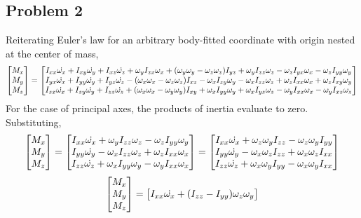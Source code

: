 \documentclass[class=report, 12pt, crop=false]{standalone}
\begin{document}
\begin{center}
\section{Problem 2}
\begin{comment}
\end{comment}
Reiterating Euler's law for an arbitrary body-fitted coordinate with origin nested at the center of mass,
$$\begin{bmatrix}M_x \\ M_y \\ M_z\end{bmatrix} = 
\begin{bmatrix} 
I_{xx}\dot{\w_x} + I_{xy}\dot{\w_y} + I_{xz}\dot{\w_z}  + \w_yI_{zx}\w_x + (\w_y\w_y - \w_z\w_z)I_{yz} + \w_yI_{zz}\w_z - \w_zI_{yx}\w_x - \w_zI_{yy}\w_y\\
I_{yx}\dot{\w_x} + I_{yy}\dot{\w_y} + I_{yz}\dot{\w_z} - (\w_x\w_x - \w_z\w_z)I_{xz} - \w_xI_{zy}\w_y - \w_xI_{zz}\w_z + \w_zI_{xx}\w_x + \w_zI_{xy}\w_y\\
I_{zx}\dot{\w_x} + I_{zy}\dot{\w_y} + I_{zz}\dot{\w_z} + (\w_x\w_x - \w_y\w_y)I_{xy} + \w_xI_{yy}\w_y + \w_xI_{yz}\w_z - \w_yI_{xx}\w_x  - \w_yI_{xz}\w_z
\end{bmatrix}$$
For the case of principal axes, the products of inertia evaluate to zero. Substituting,
$$\begin{bmatrix}M_x \\ M_y \\ M_z\end{bmatrix} = 
\begin{bmatrix} 
I_{xx}\dot{\w_x} + \w_yI_{zz}\w_z - \w_zI_{yy}\w_y\\
I_{yy}\dot{\w_y} - \w_xI_{zz}\w_z + \w_zI_{xx}\w_x\\
I_{zz}\dot{\w_z} + \w_xI_{yy}\w_y - \w_yI_{xx}\w_x
\end{bmatrix} = \begin{bmatrix} 
I_{xx}\dot{\w_x} + \w_z\w_yI_{zz} - \w_z\w_yI_{yy}\\
I_{yy}\dot{\w_y} - \w_x\w_zI_{zz} + \w_x\w_zI_{xx}\\
I_{zz}\dot{\w_z} + \w_x\w_yI_{yy} - \w_x\w_yI_{xx}
\end{bmatrix}$$
$$\begin{bmatrix}M_x \\ M_y \\ M_z\end{bmatrix} = 
\begin{bmatrix} 
I_{xx}\dot{\w_x} + (I_{zz} - I_{yy})\w_z\w_y\\

\end{bmatrix}$$
\end{center}
\end{document}
